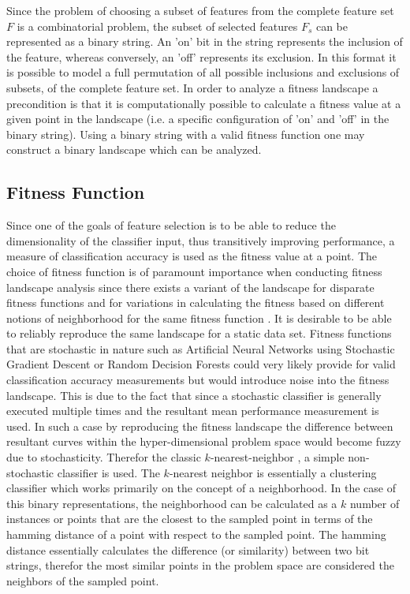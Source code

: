 \documentclass[journal,comsoc]{IEEEtran}
\begin{document}
Since the problem of choosing a subset of features from the complete feature set $F$ is a combinatorial problem, the subset of selected features $F_s$ can be represented as a binary string. An 'on' bit in the string represents the inclusion of the feature, whereas conversely, an 'off' represents its exclusion. In this format it is possible to model a full permutation of all possible inclusions and exclusions of subsets, of the complete feature set. In order to analyze a fitness landscape a precondition is that it is computationally possible to calculate a fitness value at a given point in the landscape (i.e. a specific configuration of 'on' and 'off' in the binary string). Using a binary string with a valid fitness function one may construct a binary landscape which can be analyzed.

\subsection{Fitness Function}
Since one of the goals of feature selection is to be able to reduce the dimensionality of the classifier input, thus transitively improving performance, a measure of classification accuracy is used as the fitness value at a point. The choice of fitness function is of paramount importance when conducting fitness landscape analysis since there exists a variant of the landscape for disparate fitness functions and for variations in calculating the fitness based on different notions of neighborhood for the same fitness function \cite{malan2013survey}. It is desirable to be able to reliably reproduce the same landscape for a static data set. Fitness functions that are stochastic in nature such as Artificial Neural Networks using Stochastic Gradient Descent or Random Decision Forests could very likely provide for valid classification accuracy measurements but would introduce noise into the fitness landscape. This is due to the fact that since a stochastic classifier is generally executed multiple times and the resultant mean performance measurement is used. In such a case by reproducing the fitness landscape the difference between resultant curves within the hyper-dimensional problem space would become fuzzy due to stochasticity. Therefor the classic $k$-nearest-neighbor \cite{cunningham2007k}, a simple non-stochastic classifier is used. The $k$-nearest neighbor is essentially a clustering classifier which works primarily on the concept of a neighborhood. In the case of this binary representations, the neighborhood can be calculated as a $k$ number of instances or points that are the closest to the sampled point in terms of the hamming distance of a point with respect to the sampled point. The hamming distance essentially calculates the difference (or similarity) between two bit strings, therefor the most similar points in the problem space are considered the neighbors of the sampled point.
\end{document}
